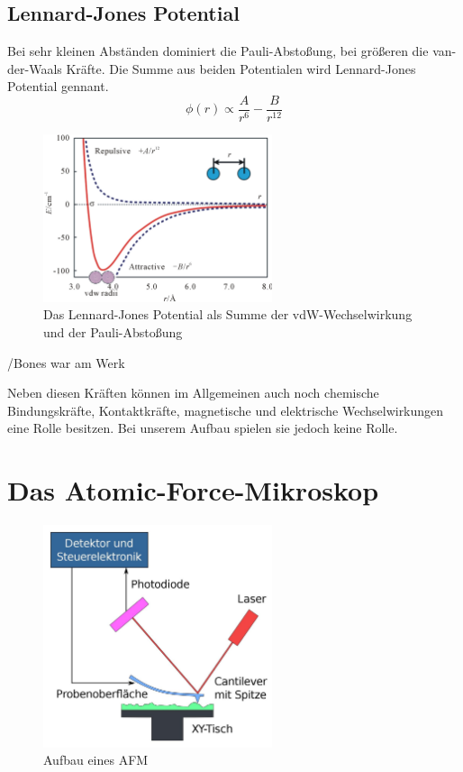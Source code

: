         \subsection{Lennard-Jones Potential}

Bei sehr kleinen Abständen dominiert die Pauli-Abstoßung, bei größeren die 
van-der-Waals Kräfte. Die Summe aus beiden Potentialen wird Lennard-Jones 
Potential gennant. 
\[
   \phi (r) \propto \frac{A}{r^6} - \frac{B}{r^{12}}    
\]

\begin{figure}[hb]
    \centering
    \includegraphics[width=0.6\textwidth]{Abb/ljp.jpg}
    \caption{Das Lennard-Jones Potential als Summe der vdW-Wechselwirkung und
             der Pauli-Abstoßung}
    \label{ljp}
\end{figure}


/Bones war am Werk


Neben diesen Kräften können im Allgemeinen auch noch chemische Bindungskräfte, Kontaktkräfte, magnetische und elektrische Wechselwirkungen eine Rolle besitzen.
Bei unserem Aufbau spielen sie jedoch keine Rolle.



 \section{Das Atomic-Force-Mikroskop}
 
 \begin{figure}[afm]
    \centering
    \includegraphics[width=0.6\textwidth]{Abb/afm.jpg}
    \caption{Aufbau eines AFM}
    \label{afm}
\end{figure}
 
